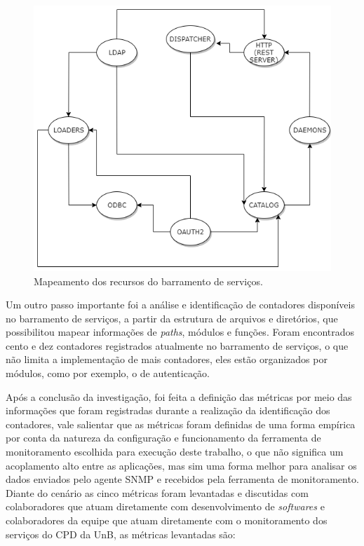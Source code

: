 \begin{figure}[h!]
	\begin{center}
	\includegraphics[scale = 0.70]{img/ResourcesEMS.png}
	\caption{Mapeamento dos recursos do barramento de serviços.}
	\label{fun:fig:ResourcesEMS}
	\end{center}
\end{figure}

Um outro passo importante foi a análise e identificação de contadores disponíveis no barramento de serviços, a partir da estrutura de arquivos e diretórios, que possibilitou mapear informações de \textit{paths}, módulos e funções. Foram encontrados cento e dez contadores registrados atualmente no barramento de serviços, o que não limita a implementação de mais contadores, eles estão organizados por módulos, como por exemplo, o de autenticação.  

Após a conclusão da investigação, foi feita a definição das métricas por meio das informações que foram registradas durante a realização da identificação dos contadores, vale salientar que as métricas foram definidas de uma forma empírica por conta da natureza da configuração e funcionamento da ferramenta de monitoramento escolhida para execução deste trabalho, o que não significa um acoplamento alto entre as aplicações, mas sim uma forma melhor para analisar os dados enviados pelo agente \acrshort{SNMP} e recebidos pela ferramenta de monitoramento. Diante do cenário as cinco métricas foram levantadas e discutidas com colaboradores que atuam diretamente com desenvolvimento de  \textit{softwares} e colaboradores da equipe que atuam diretamente com o monitoramento dos serviços do \acrshort{CPD} da \acrshort{UnB}, as métricas levantadas são: 

